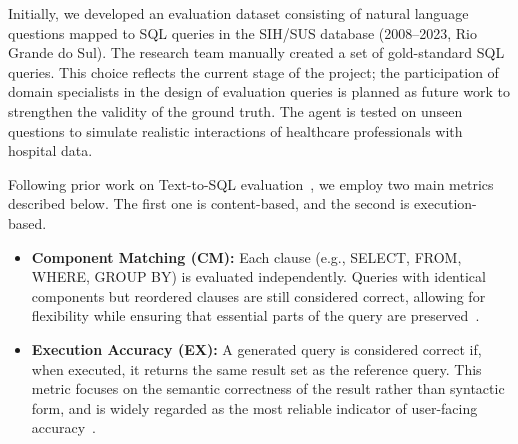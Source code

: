 \documentclass[sigconf,natbib=false]{acmart}
\begin{document}
Initially, we developed an evaluation dataset consisting of natural language questions mapped to SQL queries in the SIH/SUS database (2008--2023, Rio Grande do Sul). The research team manually created a set of gold-standard SQL queries. This choice reflects the current stage of the project; the participation of domain specialists in the design of evaluation queries is planned as future work to strengthen the validity of the ground truth. The agent is tested on unseen questions to simulate realistic interactions of healthcare professionals with hospital data.

Following prior work on Text-to-SQL evaluation~\cite{yu2018spider}, we employ two main metrics described below. The first one is content-based, and the second is execution-based.

\begin{itemize}
    \item \textbf{Component Matching (CM):} Each clause (e.g., SELECT, FROM, WHERE, GROUP BY) is evaluated independently. Queries with identical components but reordered clauses are still considered correct, allowing for flexibility while ensuring that essential parts of the query are preserved~\cite{yu2018spider}.
\end{itemize}

\begin{itemize}
    \item \textbf{Execution Accuracy (EX):} A generated query is considered correct if, when executed, it returns the same result set as the reference query. This metric focuses on the semantic correctness of the result rather than syntactic form, and is widely regarded as the most reliable indicator of user-facing accuracy~\cite{yu2018spider}.
\end{itemize}
\end{document}
